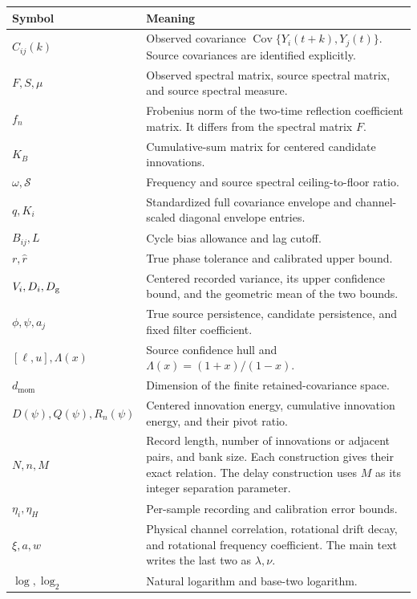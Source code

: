 \documentclass[11pt]{article}
\begin{document}
\begin{center}\small
\begin{tabular}{@{}p{}p{}@{}}\toprule
Symbol & Meaning \\\midrule
$C_{ij}(k)$ & Observed covariance $\operatorname{Cov}\{Y_i(t+k),Y_j(t)\}$. Source covariances are identified explicitly. \\
$F,S,\mu$ & Observed spectral matrix, source spectral matrix, and source spectral measure. \\
$f_n$ & Frobenius norm of the two-time reflection coefficient matrix. It differs from the spectral matrix $F$. \\
$K_B$ & Cumulative-sum matrix for centered candidate innovations. \\
$\omega,\mathcal S$ & Frequency and source spectral ceiling-to-floor ratio. \\
$q,K_i$ & Standardized full covariance envelope and channel-scaled diagonal envelope entries. \\
$B_{ij},L$ & Cycle bias allowance and lag cutoff. \\
$r,\widehat r$ & True phase tolerance and calibrated upper bound. \\
$V_i,D_i,D_{\rm g}$ & Centered recorded variance, its upper confidence bound, and the geometric mean of the two bounds. \\
$\phi,\psi,a_j$ & True source persistence, candidate persistence, and fixed filter coefficient. \\
$[\ell,u],\Lambda(x)$ & Source confidence hull and $\Lambda(x)=(1+x)/(1-x)$. \\
$d_{\mathrm{mom}}$ & Dimension of the finite retained-covariance space. \\
$D(\psi),Q(\psi),R_n(\psi)$ & Centered innovation energy, cumulative innovation energy, and their pivot ratio. \\
$N,n,M$ & Record length, number of innovations or adjacent pairs, and bank size. Each construction gives their exact relation. The delay construction uses $M$ as its integer separation parameter. \\
$\eta_i,\eta_H$ & Per-sample recording and calibration error bounds. \\
$\xi,a,w$ & Physical channel correlation, rotational drift decay, and rotational frequency coefficient. The main text writes the last two as $\lambda,\nu$. \\
$\log,\log_2$ & Natural logarithm and base-two logarithm. \\\bottomrule
\end{tabular}
\end{center}
\end{document}
